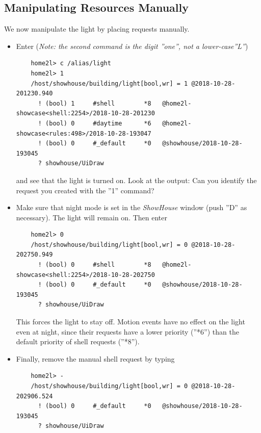 \documentclass[12pt,english,parskip=half]{scrreprt}
\begin{document}
\subsection{Manipulating Resources Manually}
\label{sec:tutorial-shell-manipulate}


We now manipulate the light by placing requests manually.

\begin{itemize}[$\blacktriangleright$]

\item
  Enter (\emph{Note: the second command is the digit ''one'', not a
  lower-case''L''})
  \begin{lstlisting}
    home2l> c /alias/light
    home2l> 1
    /host/showhouse/building/light[bool,wr] = 1 @2018-10-28-201230.940
      ! (bool) 1     #shell        *8   @home2l-showcase<shell:2254>/2018-10-28-201230
      ! (bool) 0     #daytime      *6   @home2l-showcase<rules:498>/2018-10-28-193047
      ! (bool) 0     #_default     *0   @showhouse/2018-10-28-193045
      ? showhouse/UiDraw
  \end{lstlisting}
  and see that the light is turned on. Look at the output: Can you
  identify the request you created with the ''1'' command?

\item
  Make sure that night mode is set in the \emph{ShowHouse} window (push ''D'' as necessary). The
  light will remain on. Then enter
  \begin{lstlisting}
    home2l> 0
    /host/showhouse/building/light[bool,wr] = 0 @2018-10-28-202750.949
      ! (bool) 0     #shell        *8   @home2l-showcase<shell:2254>/2018-10-28-202750
      ! (bool) 0     #_default     *0   @showhouse/2018-10-28-193045
      ? showhouse/UiDraw
  \end{lstlisting}
  This forces the light to stay off. Motion events have no effect on the
  light even at night, since their requests have a lower priority
  (''*6'') than the default priority of shell requests (''*8'').

\item
  Finally, remove the manual shell request by typing
  \begin{lstlisting}
    home2l> -
    /host/showhouse/building/light[bool,wr] = 0 @2018-10-28-202906.524
      ! (bool) 0     #_default     *0   @showhouse/2018-10-28-193045
      ? showhouse/UiDraw
  \end{lstlisting}

\end{itemize}
\end{document}
